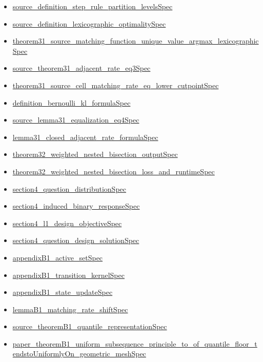 \documentclass[10pt]{article}
\begin{document}
\begin{itemize}[leftmargin=1.2em]
\begin{itemize}[leftmargin=1.2em]
\item \hyperlink{source-claim-9c0b6bf527ad55ca}{source\_definition\_step\_rule\_partition\_levelsSpec}
\item \hyperlink{source-claim-b2f4ad11d62b1527}{source\_definition\_lexicographic\_optimalitySpec}
\item \hyperlink{source-claim-84eec684fc1865ab}{theorem31\_source\_matching\_function\_unique\_value\_argmax\_lexicographicSpec}
\item \hyperlink{source-claim-8a7eb113492e3a82}{source\_theorem31\_adjacent\_rate\_eq3Spec}
\item \hyperlink{source-claim-50a2d9627ea4a9d0}{theorem31\_source\_cell\_matching\_rate\_eq\_lower\_cutpointSpec}
\item \hyperlink{source-claim-74286919e0e8cecc}{definition\_bernoulli\_kl\_formulaSpec}
\item \hyperlink{source-claim-d2fd3442bfa83879}{source\_lemma31\_equalization\_eq4Spec}
\item \hyperlink{source-claim-e679d8fd634fddb9}{lemma31\_closed\_adjacent\_rate\_formulaSpec}
\item \hyperlink{source-claim-71d943c2f56bac62}{theorem32\_weighted\_nested\_bisection\_outputSpec}
\item \hyperlink{source-claim-9c02a19f4b41b0c2}{theorem32\_weighted\_nested\_bisection\_loss\_and\_runtimeSpec}
\item \hyperlink{source-claim-7159be549a8d27ef}{section4\_question\_distributionSpec}
\item \hyperlink{source-claim-a5f9ed46c3edb5c1}{section4\_induced\_binary\_responseSpec}
\item \hyperlink{source-claim-3fed172202fb05fc}{section4\_l1\_design\_objectiveSpec}
\item \hyperlink{source-claim-642a63ff09a11d8b}{section4\_question\_design\_solutionSpec}
\item \hyperlink{source-claim-ffa7fbb9f1c16e4b}{appendixB1\_active\_setSpec}
\item \hyperlink{source-claim-9053ffafcfb8db42}{appendixB1\_transition\_kernelSpec}
\item \hyperlink{source-claim-6724e8b8f279b968}{appendixB1\_state\_updateSpec}
\item \hyperlink{source-claim-52ebae870dd67c82}{lemmaB1\_matching\_rate\_shiftSpec}
\item \hyperlink{source-claim-f84fba16d2553222}{source\_theoremB1\_quantile\_representationSpec}
\item \hyperlink{source-claim-5249ffde05e3b08f}{paper\_theoremB1\_uniform\_subsequence\_principle\_to\_of\_quantile\_floor\_tendstoUniformlyOn\_geometric\_meshSpec}

\end{itemize}
\end{itemize}
\end{document}
